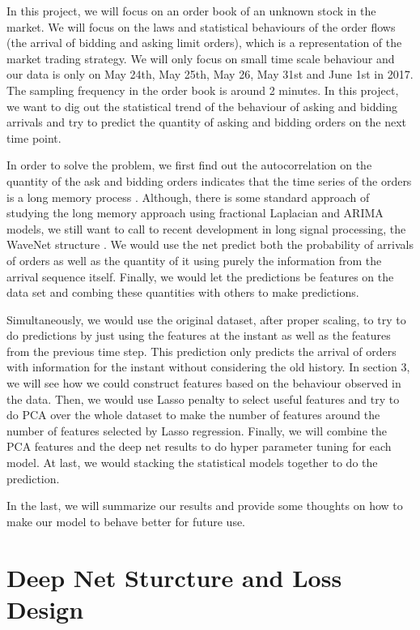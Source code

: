 \documentclass[letterpaper,12pt]{article}
\numberwithin{equation}{section}
\begin{document}
In this project, we will focus on an order book of an unknown stock in the market. We will focus on the laws and statistical behaviours of the order flows (the arrival of bidding and asking limit orders), which is a representation of the market trading strategy. We will only focus on small time scale behaviour and our data is only on May 24th, May 25th, May 26, May 31st and June 1st in 2017. The sampling frequency in the order book is around 2 minutes. In this project, we want to dig out the statistical trend of the behaviour of asking and bidding arrivals and try to predict the quantity of asking and bidding orders on the next time point.

In order to solve the problem, we first find out the autocorrelation on the quantity of the ask and bidding orders indicates that the time series of the orders is a long memory process \cite{bhansali2003prediction}. Although, there is some standard approach of studying the long memory approach using fractional Laplacian and ARIMA models, we still want to call to recent development in long signal processing, the WaveNet structure \cite{DBLP:journals/corr/OordDZSVGKSK16}. We would use the net predict both the probability of arrivals of orders as well as the quantity of it using purely the information from the arrival sequence itself. Finally, we would let the predictions be features on the data set and combing these quantities with others to make predictions. 

Simultaneously, we would use the original dataset, after proper scaling, to try to do predictions by just using the features at the instant as well as the features from the previous time step. This prediction only predicts the arrival of orders with information for the instant without considering the old history. In section 3, we will see how we could construct features based on the behaviour observed in the data. Then, we would use Lasso penalty to select useful features and try to do PCA over the whole dataset to make the number of features around the number of features selected by Lasso regression. 
Finally, we will combine the PCA features and the deep net results to do hyper parameter tuning for each model. At last, we would stacking the statistical models together to do the prediction. 

In the last, we will summarize our results and provide some thoughts on how to make our model to behave better for future use. 



\section{Deep Net Sturcture and Loss Design}
\end{document}
